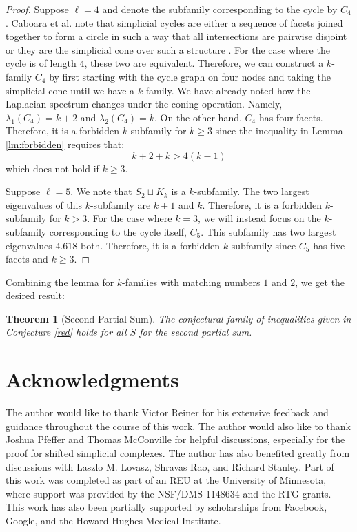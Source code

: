 \documentclass[11pt]{article}
\newtheorem{thm}[lm]{Theorem}
\begin{document}
\begin{proof}
Suppose $\ell = 4$ and denote the subfamily corresponding to the cycle by $C_4$. Caboara et al. note that simplicial cycles are either a sequence of facets joined together to form a circle in such a way that all intersections are pairwise disjoint or they are the simplicial cone over such a structure \cite{F2}. For the case where the cycle is of length $4$, these two are equivalent. Therefore, we can construct a $k$-family $C_4$ by first starting with the cycle graph on four nodes and taking the simplicial cone until we have a $k$-family. We have already noted how the Laplacian spectrum changes under the coning operation. Namely, $\lambda_1(C_4) = k+2$ and $\lambda_2(C_4) = k$. On the other hand, $C_4$ has four facets. Therefore, it is a forbidden $k$-subfamily for $k \geq 3$ since the inequality in Lemma \ref{lm:forbidden} requires that:
$$ k + 2 + k > 4(k-1)$$
which does not hold if $k \geq 3$.


Suppose $\ell = 5$. We note that $S_2 \sqcup K_{k}$ is a $k$-subfamily. The two largest eigenvalues of this $k$-subfamily are $k+1$ and $k$. Therefore, it is a forbidden $k$-subfamily for $k > 3$. For the case where $k = 3$, we will instead focus on the $k$-subfamily corresponding to the cycle itself, $C_5$. This subfamily has two largest eigenvalues $4.618$ both. Therefore, it is a forbidden $k$-subfamily since $C_5$ has five facets and $k \geq 3$.

\end{proof}



Combining the lemma for $k$-families with matching numbers $1$ and $2$, we get the desired result:


\begin{thm}[Second Partial Sum]\label{thm:sps}
The conjectural family of inequalities given in Conjecture \ref{red} holds for all $S$ for the second partial sum.
\end{thm}





\section*{Acknowledgments}

The author would like to thank Victor Reiner for his extensive feedback and guidance throughout the course of this work. The author would also like to thank Joshua Pfeffer and Thomas McConville for helpful discussions, especially for the proof for shifted simplicial complexes. The author has also benefited greatly from discussions with Laszlo M. Lovasz, Shravas Rao, and Richard Stanley. Part of this work was completed as part of an REU at the University of Minnesota, where support was provided by the NSF/DMS-1148634 and the RTG grants. This work has also been partially supported by scholarships from Facebook, Google, and the Howard Hughes Medical Institute.




\end{document}
